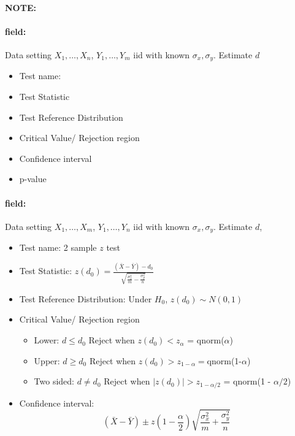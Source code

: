 \documentclass[12pt]{article}
\newenvironment{note}{\paragraph{NOTE:}}{}
\newenvironment{field}{\paragraph{field:}}{}
\begin{document}
\begin{note}
  \begin{field}
    Data setting $X_1, \ldots , X_n$, $Y_1, \ldots, Y_m$ iid with known $\sigma_x, \sigma_y$. Estimate $d$
    \begin{itemize}
      \item Test name:
      \item Test Statistic
      \item Test Reference Distribution
      \item Critical Value/ Rejection region
      \item Confidence interval
      \item p-value
    \end{itemize}
  \end{field}
  \begin{field}
    Data setting $X_1, \ldots , X_m$, $Y_1, \ldots, Y_n$ iid with known $\sigma_x, \sigma_y$. Estimate $d$,
    \begin{itemize}
      \item Test name: 2 sample $z$ test
      \item Test Statistic: $z(d_0) = \frac{(\bar{X}- \bar{Y}) - d_0}{\sqrt{\frac{\sigma_x^2}{m} - \frac{\sigma_y^2}{n}}}$
      \item Test Reference Distribution: Under $H_0$, $z(d_0) \sim N(0,1)$
      \item Critical Value/ Rejection region
      \begin{itemize}
        \item Lower: $d \leq d_0$ Reject when $z(d_0) < z_{\alpha}$ = qnorm($\alpha$)
        \item Upper: $d \geq d_0$ Reject when $z(d_0) > z_{1 - \alpha} = $qnorm(1-$\alpha$)
        \item Two sided: $d \neq d_0$ Reject when $|z(d_0)| > z_{1 - \alpha/2}$ = qnorm(1 - $\alpha/2$)
      \end{itemize}
      \item Confidence interval: $$ (\bar{X} - \bar{Y}) \pm z(1 - \frac{\alpha}{2})\sqrt{\frac{\sigma_x^2}{m} + \frac{\sigma_y^2}{n}} $$
    \end{itemize}
  \end{field}
\end{note}
\end{document}
